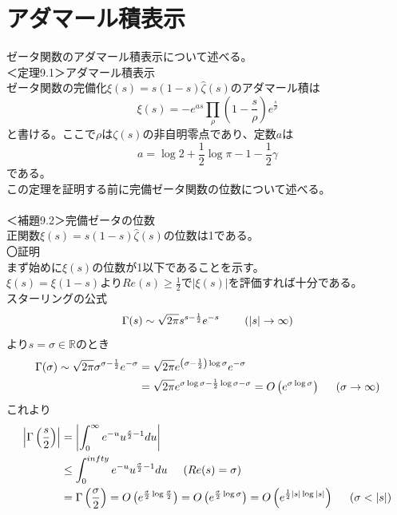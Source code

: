 \documentclass{jsarticle}
\begin{document}
\section{アダマール積表示}
ゼータ関数のアダマール積表示について述べる。\\
＜定理9.1＞アダマール積表示\\
ゼータ関数の完備化\(\xi(s)=s(1-s)\hat{\zeta}(s)\)のアダマール積は
\begin{equation}
\xi(s)=-e^{as}\prod_{\rho}\left(1-\frac{s}{\rho}\right)e^{\frac{s}{\rho}}
\end{equation}
と書ける。ここで\(\rho\)は\(\zeta(s)\)の非自明零点であり、定数\(a\)は
\[a=\log2+\frac{1}{2}\log\pi-1-\frac{1}{2}\gamma\]である。\\
この定理を証明する前に完備ゼータ関数の位数について述べる。\\
\\
＜補題9.2＞完備ゼータの位数\\
正関数\(\xi(s)=s(1-s)\hat{\zeta}(s)\)の位数は1である。\\
〇証明\\
まず始めに\(\xi(s)\)の位数が1以下であることを示す。\\
\(\xi(s)=\xi(1-s)\)より\(Re(s)\geq\frac{1}{2}\)で\(|\xi(s)|\)を評価すれば十分である。\\
スターリングの公式
\begin{equation}
\Gamma(s)\sim\sqrt{2\pi}s^{s-\frac{1}{2}}e^{-s}\hspace{8mm}(|s|\to\infty)
\end{equation}
より\(s=\sigma\in\mathbb{R}\)のとき
\begin{align*}
\Gamma(\sigma)\sim\sqrt{2\pi}\sigma^{\sigma-\frac{1}{2}}e^{-\sigma}&=\sqrt{2\pi}e^{\left(\sigma-\frac{1}{2}\right)\log\sigma}e^{-\sigma}\\
&=\sqrt{2\pi}e^{\sigma\log\sigma-\frac{1}{2}\log\sigma-\sigma}=O\left(e^{\sigma\log\sigma}\right)\hspace{5mm}(\sigma\to\infty)
\end{align*}
これより
\begin{align*}
\left|\Gamma\left(\frac{s}{2}\right)\right|&=\left|\int_{0}^{\infty}e^{-u}u^{\frac{s}{2}-1}du\right|\\
&\leq\int_{0}^{infty}e^{-u}u^{\frac{\sigma}{2}-1}du\hspace{5mm}(Re(s)=\sigma)\\
&=\Gamma\left(\frac{\sigma}{2}\right)=O\left(e^{\frac{\sigma}{2}\log\frac{\sigma}{2}}\right)=O\left(e^{\frac{\sigma}{2}\log\sigma}\right)=O\left(e^{\frac{1}{2}|s|\log|s|}\right)\hspace{5mm}(\sigma<|s|)
\end{align*}
\end{document}
